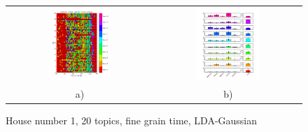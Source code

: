 \begin{figure}
 \centering
 \begin{tabular}{c c}
  \includegraphics[width=0.45\textwidth]{Pictures/Gaus/fine/DayHN1TS48k20fine.png}
  &
  \includegraphics[width=0.45\textwidth]{Pictures/Gaus/fine/TopHN1TS48k20fine.png}\\
  a) & b)
 \end{tabular}
  \caption{House number 1, 20 topics, fine grain time, LDA-Gaussian}
  \label{fig:HN1Gaus20fine}
\end{figure}

